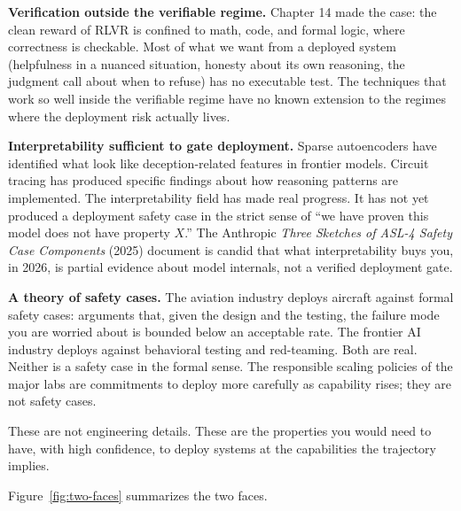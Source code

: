 \textbf{Verification outside the verifiable regime.} Chapter 14 made the case: the clean reward of RLVR is confined to math, code, and formal logic, where correctness is checkable. Most of what we want from a deployed system (helpfulness in a nuanced situation, honesty about its own reasoning, the judgment call about when to refuse) has no executable test. The techniques that work so well inside the verifiable regime have no known extension to the regimes where the deployment risk actually lives.

\textbf{Interpretability sufficient to gate deployment.} Sparse autoencoders have identified what look like deception-related features in frontier models. Circuit tracing has produced specific findings about how reasoning patterns are implemented. The interpretability field has made real progress. It has not yet produced a deployment safety case in the strict sense of ``we have proven this model does not have property $X$.'' The Anthropic \textit{Three Sketches of ASL-4 Safety Case Components} (2025) document is candid that what interpretability buys you, in 2026, is partial evidence about model internals, not a verified deployment gate.

\textbf{A theory of safety cases.} The aviation industry deploys aircraft against formal safety cases: arguments that, given the design and the testing, the failure mode you are worried about is bounded below an acceptable rate. The frontier AI industry deploys against behavioral testing and red-teaming. Both are real. Neither is a safety case in the formal sense. The responsible scaling policies of the major labs are commitments to deploy more carefully as capability rises; they are not safety cases.

These are not engineering details. These are the properties you would need to have, with high confidence, to deploy systems at the capabilities the trajectory implies.

Figure~\ref{fig:two-faces} summarizes the two faces.

